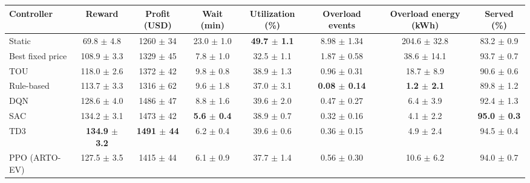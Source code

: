 \begin{tabular}{@{}lccccccc@{}}
\toprule
Controller & Reward & Profit (USD) & Wait (min) & Utilization (\%) & Overload events & Overload energy (kWh) & Served (\%) \\
\midrule
Static & 69.8 $\pm$ 4.8 & 1260 $\pm$ 34 & 23.0 $\pm$ 1.0 & \textbf{49.7 $\pm$ 1.1} & 8.98 $\pm$ 1.34 & 204.6 $\pm$ 32.8 & 83.2 $\pm$ 0.9 \\
Best fixed price & 108.9 $\pm$ 3.3 & 1329 $\pm$ 45 & 7.8 $\pm$ 1.0 & 32.5 $\pm$ 1.1 & 1.87 $\pm$ 0.58 & 38.6 $\pm$ 14.1 & 93.7 $\pm$ 0.7 \\
TOU & 118.0 $\pm$ 2.6 & 1372 $\pm$ 42 & 9.8 $\pm$ 0.8 & 38.9 $\pm$ 1.3 & 0.96 $\pm$ 0.31 & 18.7 $\pm$ 8.9 & 90.6 $\pm$ 0.6 \\
Rule-based & 113.7 $\pm$ 3.3 & 1316 $\pm$ 62 & 9.6 $\pm$ 1.8 & 37.0 $\pm$ 3.1 & \textbf{0.08 $\pm$ 0.14} & \textbf{1.2 $\pm$ 2.1} & 89.8 $\pm$ 1.2 \\
DQN & 128.6 $\pm$ 4.0 & 1486 $\pm$ 47 & 8.8 $\pm$ 1.6 & 39.6 $\pm$ 2.0 & 0.47 $\pm$ 0.27 & 6.4 $\pm$ 3.9 & 92.4 $\pm$ 1.3 \\
SAC & 134.2 $\pm$ 3.1 & 1473 $\pm$ 42 & \textbf{5.6 $\pm$ 0.4} & 38.9 $\pm$ 0.7 & 0.32 $\pm$ 0.16 & 4.1 $\pm$ 2.2 & \textbf{95.0 $\pm$ 0.3} \\
TD3 & \textbf{134.9 $\pm$ 3.2} & \textbf{1491 $\pm$ 44} & 6.2 $\pm$ 0.4 & 39.6 $\pm$ 0.6 & 0.36 $\pm$ 0.15 & 4.9 $\pm$ 2.4 & 94.5 $\pm$ 0.4 \\
PPO (ARTO-EV) & 127.5 $\pm$ 3.5 & 1415 $\pm$ 44 & 6.1 $\pm$ 0.9 & 37.7 $\pm$ 1.4 & 0.56 $\pm$ 0.30 & 10.6 $\pm$ 6.2 & 94.0 $\pm$ 0.7 \\
\bottomrule
\end{tabular}